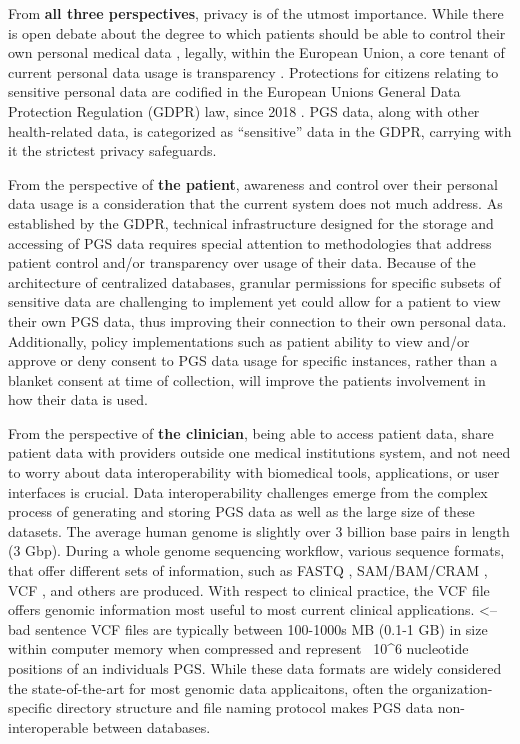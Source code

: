 \documentclass[a4paper,11pt]{article}
\begin{document}
From \textbf{all three perspectives}, privacy is of the utmost importance. 
While there is open debate about the degree to which patients should be able to control their own personal medical data \cite{blumenthal_giving_2015,damen_patients_2022}, legally, within the European Union, a core tenant of current personal data usage is transparency \cite{spagnuelo_qualifying_2020}. 
Protections for citizens relating to sensitive personal data are codified in the European Union\textquotesingle s General Data Protection Regulation (GDPR) law, since 2018 \cite{noauthor_regulation_2016}. 
PGS data, along with other health-related data, is categorized as “sensitive” data in the GDPR, carrying with it the strictest privacy safeguards. 

From the perspective of \textbf{the patient}, 
awareness and control over their personal data usage is a consideration that the current system does not much address. 
As established by the GDPR, technical infrastructure designed for the storage and accessing of PGS data requires special attention to methodologies that address patient control and/or transparency over usage of their data. 
Because of the architecture of centralized databases, granular permissions for specific subsets of sensitive data are challenging to implement yet could allow for a patient to view their own PGS data, thus improving their connection to their own personal data. 
Additionally, policy implementations such as patient ability to view and/or approve or deny consent to PGS data usage for specific instances, rather than a blanket consent at time of collection, will improve the patient\textquotesingle s involvement in how their data is used. 

From the perspective of \textbf{the clinician}, being able to access patient data, share patient data with providers outside one medical institution\textquotesingle s system, and not need to worry about data interoperability with biomedical tools, applications, or user interfaces is crucial. 
Data interoperability challenges emerge from the complex process of generating and storing PGS data as well as the large size of these datasets. 
The average human genome is slightly over 3 billion base pairs in length (3 Gbp). 
During a whole genome sequencing workflow, various sequence formats, that offer different sets of information, such as FASTQ \cite{cock_sanger_2010}, SAM/BAM/CRAM \cite{li_sequence_2009, bonfield_cram_2022}, VCF \cite{danecek_variant_2011}, and others are produced. 
With respect to clinical practice, the VCF file offers genomic information most useful to most current clinical applications. <-- bad sentence
VCF files are typically between 100-1000s MB (0.1-1 GB) in size within computer memory when compressed and represent ~10^6 nucleotide positions of an individual\textquotesingle s PGS. 
While these data formats are widely considered the state-of-the-art for most genomic data applicaitons, often the organization-specific directory structure and file naming protocol makes PGS data non-interoperable between databases.
\end{document}
